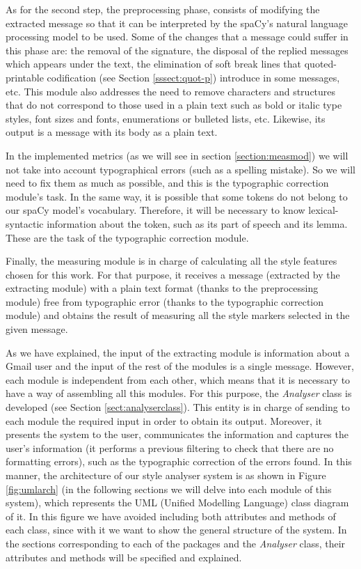 As for the second step, the preprocessing phase, consists of modifying the extracted message so that it can be interpreted by the spaCy's natural language processing model to be used. Some of the changes that a message could suffer in this phase are: the removal of the signature, the disposal of the replied messages which appears under the text, the elimination of soft break lines that quoted-printable codification (see Section \ref{sssect:quot-p}) introduce in some messages, etc. This module also addresses the need to remove characters and structures that do not correspond to those used in a plain text such as bold or italic type styles, font sizes and fonts, enumerations or bulleted lists, etc. Likewise, its output is a message with its body as a plain text.

In the implemented metrics (as we will see in section \ref{section:measmod}) we will not take into account typographical errors (such as a spelling mistake). So we will need to fix them as much as possible, and this is the typographic correction module's task. In the same way, it is possible that some tokens do not belong to our spaCy model's vocabulary. Therefore, it will be necessary to know lexical-syntactic information about the token, such as its part of speech and its lemma. These are the task of the typographic correction module.

Finally, the measuring module is in charge of calculating all the style features chosen for this work. For that purpose, it receives a message (extracted by the extracting module) with a plain text format (thanks to the preprocessing module) free from typographic error (thanks to the typographic correction module) and obtains the result of measuring all the style markers selected in the given message.

As we have explained, the input of the extracting module is information about a Gmail user and the input of the rest of the modules is a single message. However, each module is independent from each other, which means that it is necessary to have a way of assembling all this modules. For this purpose, the \textit{Analyser} class is developed (see Section \ref{sect:analyserclass}). This entity is in charge of sending to each module the required input in order to obtain its output. Moreover, it presents the system to the user, communicates the information and captures the user's information (it performs a previous filtering to check that there are no formatting errors), such as the typographic correction of the errors found. In this manner, the architecture of our style analyser system is as shown in Figure \ref{fig:umlarch} (in the following sections we will delve into each module of this system), which represents the UML (Unified Modelling Language) class diagram of it. In this figure we have avoided including both attributes and methods of each class, since with it we want to show the general structure of the system. In the sections corresponding to each of the packages and the \textit{Analyser} class, their attributes and methods will be specified and explained.

